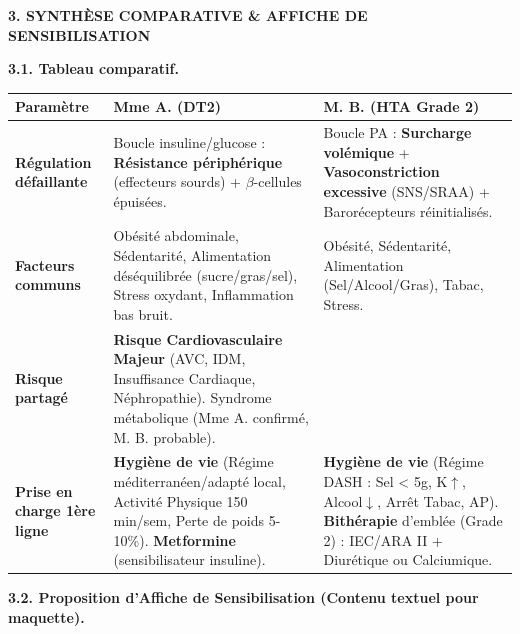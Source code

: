 \documentclass[11pt]{article}
\begin{document}
\begin{exoresolu}
\vspace{1em}
\textbf{3. SYNTHÈSE COMPARATIVE \& AFFICHE DE SENSIBILISATION}

\textbf{3.1. Tableau comparatif.}
\begin{center}
\begin{tabularx}{\linewidth}{|l|X|X|}\hline
\textbf{Paramètre} & \textbf{Mme A. (DT2)} & \textbf{M. B. (HTA Grade 2)} \\ \hline
\textbf{Régulation défaillante} & Boucle insuline/glucose : \textbf{Résistance périphérique} (effecteurs sourds) + $\beta$-cellules épuisées. & Boucle PA : \textbf{Surcharge volémique} + \textbf{Vasoconstriction excessive} (SNS/SRAA) + Barorécepteurs réinitialisés. \\ \hline
\textbf{Facteurs communs} & Obésité abdominale, Sédentarité, Alimentation déséquilibrée (sucre/gras/sel), Stress oxydant, Inflammation bas bruit. & Obésité, Sédentarité, Alimentation (Sel/Alcool/Gras), Tabac, Stress. \\ \hline
\textbf{Risque partagé} & \textbf{Risque Cardiovasculaire Majeur} (AVC, IDM, Insuffisance Cardiaque, Néphropathie). Syndrome métabolique (Mme A. confirmé, M. B. probable). \\ \hline
\textbf{Prise en charge 1ère ligne} & \textbf{Hygiène de vie} (Régime méditerranéen/adapté local, Activité Physique 150 min/sem, Perte de poids 5-10\%). \textbf{Metformine} (sensibilisateur insuline). & \textbf{Hygiène de vie} (Régime DASH : Sel < 5g, K$\uparrow$, Alcool$\downarrow$, Arrêt Tabac, AP). \textbf{Bithérapie} d'emblée (Grade 2) : IEC/ARA II + Diurétique ou Calciumique. \\ \hline
\end{tabularx}
\end{center}

\textbf{3.2. Proposition d'Affiche de Sensibilisation (Contenu textuel pour maquette).}
\begin{center}
\end{center}
\end{exoresolu}
\end{document}
